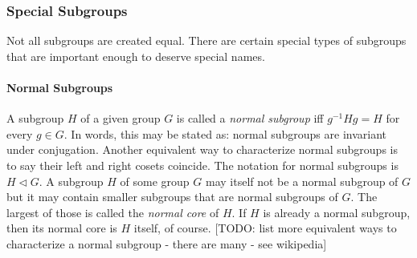 


\subsubsection{Special Subgroups}
Not all subgroups are created equal. There are certain special types of subgroups that are important enough to deserve special names.





\paragraph{Normal Subgroups} A subgroup $H$ of a given group $G$ is called a \emph{normal subgroup} iff $g^{-1} H g = H$ for every $g \in G$. In words, this may be stated as: normal subgroups are invariant under conjugation. Another equivalent way to characterize normal subgroups is to say their left and right cosets coincide. The notation for normal subgroups is $H \triangleleft G$. A subgroup $H$ of some group $G$ may itself not be a normal subgroup of $G$ but it may contain smaller subgroups that are normal subgroups of $G$. The largest of those is called the \emph{normal core} of $H$. If $H$ is already a normal subgroup, then its normal core is $H$ itself, of course. [TODO: list more equivalent ways to characterize a normal subgroup - there are many - see wikipedia]







